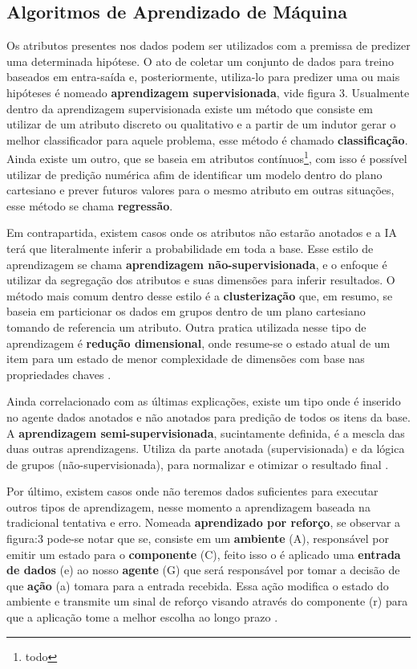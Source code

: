 \subsection{Algoritmos de Aprendizado de Máquina}
Os atributos presentes nos dados podem ser utilizados com a premissa de predizer uma determinada hipótese. O ato de coletar um conjunto de dados para treino baseados em entra-saída e, posteriormente, utiliza-lo para predizer uma ou mais hipóteses é nomeado \textbf{aprendizagem supervisionada}, vide figura 3. Usualmente dentro da aprendizagem supervisionada existe um método que consiste em utilizar de um atributo discreto ou qualitativo e a partir de um indutor gerar o melhor classificador para aquele problema, esse método é chamado \textbf{classificação}. Ainda existe um outro, que se baseia em atributos contínuos\footnote{todo}, com isso é possível utilizar de predição numérica afim de identificar um modelo dentro do plano cartesiano e prever futuros valores para o mesmo atributo em outras situações, esse método se chama \textbf{regressão}. \cite{hastie2009unsupervised, russell2003artificial}

Em contrapartida, existem casos onde os atributos não estarão anotados e a IA terá que literalmente inferir a probabilidade em toda a base. Esse estilo de aprendizagem se chama \textbf{aprendizagem não-supervisionada}, e o enfoque é utilizar da segregação dos atributos e suas dimensões para inferir resultados. O método mais comum dentro desse estilo é a \textbf{clusterização} que, em resumo, se baseia em particionar os dados em grupos dentro de um plano cartesiano tomando de referencia um atributo. Outra pratica utilizada nesse tipo de aprendizagem é \textbf{redução dimensional}, onde resume-se o estado atual de um item para um estado de menor complexidade de dimensões com base nas propriedades chaves \cite{hastie2009unsupervised, mohri2012foundations}.

Ainda correlacionado com as últimas explicações, existe um tipo onde é inserido no agente dados anotados e não anotados para predição de todos os itens da base. A \textbf{aprendizagem semi-supervisionada}, sucintamente definida, é a mescla das duas outras aprendizagens. Utiliza da parte anotada (supervisionada) e da lógica de grupos (não-supervisionada), para normalizar e otimizar o resultado final \cite[7]{mohri2012foundations}.

Por último, existem casos onde não teremos dados suficientes para executar outros tipos de aprendizagem, nesse momento a aprendizagem baseada na tradicional tentativa e erro. Nomeada \textbf{aprendizado por reforço}, se observar a figura:3 pode-se notar que se, consiste em um \textbf{ambiente} (A), responsável por emitir um estado para o \textbf{componente} (C), feito isso o é aplicado uma \textbf{entrada de dados} (e) ao nosso \textbf{agente} (G) que será responsável por tomar a decisão de que \textbf{ação} (a) tomara para a entrada recebida. Essa ação modifica o estado do ambiente e transmite um sinal de reforço visando através do componente (r) para que a aplicação tome a melhor escolha ao longo prazo \cite{kaelbling1996reinforcement, russell2003artificial}.

